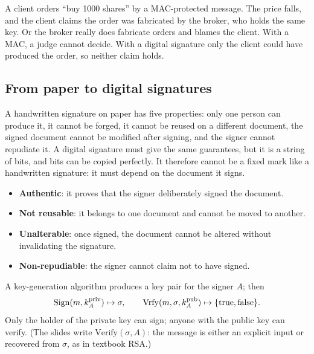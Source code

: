 \begin{example}
A client orders \enquote{buy 1000 shares} by a MAC-protected message. The price falls, and the client claims the order was fabricated by the broker, who holds the same key. Or the broker really does fabricate orders and blames the client. With a MAC, a judge cannot decide. With a digital signature only the client could have produced the order, so neither claim holds.
\end{example}

\subsection{From paper to digital signatures}

A handwritten signature on paper has five properties: only one person can produce it, it cannot be forged, it cannot be reused on a different document, the signed document cannot be modified after signing, and the signer cannot repudiate it. A digital signature must give the same guarantees, but it is a string of bits, and bits can be copied perfectly. It therefore cannot be a fixed mark like a handwritten signature: it must depend on the document it signs.

\begin{definition}
\leavevmode
\begin{itemize}
    \item \textbf{Authentic}: it proves that the signer deliberately signed the document.
    \item \textbf{Not reusable}: it belongs to one document and cannot be moved to another.
    \item \textbf{Unalterable}: once signed, the document cannot be altered without invalidating the signature.
    \item \textbf{Non-repudiable}: the signer cannot claim not to have signed.
\end{itemize}
\end{definition}

\begin{definition}
A key-generation algorithm produces a key pair for the signer $A$; then
\[
    \operatorname{Sign}(m, k_A^{\mathrm{priv}}) \mapsto \sigma, \qquad \operatorname{Vrfy}(m, \sigma, k_A^{\mathrm{pub}}) \mapsto \{\text{true}, \text{false}\}.
\]
Only the holder of the private key can sign; anyone with the public key can verify. (The slides write $\mathrm{Verify}(\sigma, A)$: the message is either an explicit input or recovered from $\sigma$, as in textbook RSA.)
\end{definition}

